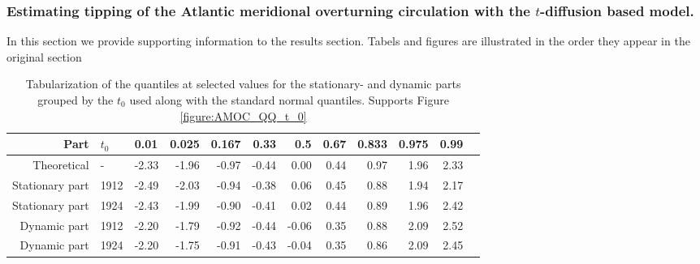 \subsubsection{Estimating tipping of the Atlantic meridional overturning circulation with the \texorpdfstring{$t$}{t}-diffusion based model.}
In this section we provide supporting information to the results section. Tabels and figures are illustrated in the order they appear in the original section
    \begin{table}[h!]
        \centering
        \begin{tabular}{rllrrrrrrrrr}
          \hline
         Part & $t_0$ & 0.01 & 0.025 & 0.167 & 0.33 & 0.5 & 0.67 & 0.833 & 0.975 & 0.99 \\ 
          \hline
        Theoretical & - & -2.33 & -1.96 & -0.97 & -0.44 & 0.00 & 0.44 & 0.97 & 1.96 & 2.33 \\ 
        Stationary part & 1912 & -2.49 & -2.03 & -0.94 & -0.38 & 0.06 & 0.45 & 0.88 & 1.94 & 2.17 \\ 
        Stationary part & 1924 & -2.43 & -1.99 & -0.90 & -0.41 & 0.02 & 0.44 & 0.89 & 1.96 & 2.42 \\ 
        Dynamic part & 1912 & -2.20 & -1.79 & -0.92 & -0.44 & -0.06 & 0.35 & 0.88 & 2.09 & 2.52 \\ 
        Dynamic part & 1924 & -2.20 & -1.75 & -0.91 & -0.43 & -0.04 & 0.35 & 0.86 & 2.09 & 2.45 \\ 
           \hline
        \end{tabular}
        \caption{Tabularization of the quantiles at selected values for the stationary- and dynamic parts grouped by the $t_0$ used along with the standard normal quantiles. Supports Figure \ref{figure:AMOC_QQ_t_0}}
        \label{table:QQ_table_parts}
        \end{table}
    
